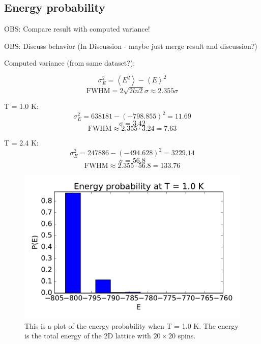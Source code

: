 \subsection{Energy probability}

OBS: Compare result with computed variance!

OBS: Discuss behavior (In Discussion - maybe just merge result and discussion?)

Computed variance (from same dataset?):

$$ \sigma_E^2 = \left< E^2\right> - \left< E\right>^2 $$
$$\text{FWHM} = 2 \sqrt{2ln2} \sigma \approx 2.355 \sigma$$ 

T = 1.0 K:
$$ \sigma_E^2 = 638181 - (-798.855)^2 = 11.69 $$
$$ \sigma = 3.42 $$
$$ \text{FWHM} \approx 2.355 \cdot 3.24 = 7.63 $$

T = 2.4 K:
$$ \sigma_E^2 =   247886 - (-494.628)^2 = 3229.14 $$
$$ \sigma = 56.8  $$
$$ \text{FWHM} \approx 2.355 \cdot 56.8 = 133.76 $$

\begin{figure}[H]
\includegraphics[width=\linewidth]{../results/4d/d_T_1probability}\caption{This is a plot of the energy probability when T = 1.0 K. The energy is the total energy of the 2D lattice with $20\times 20$ spins.}\label{fig:probability_T_1.0}
\end{figure}

